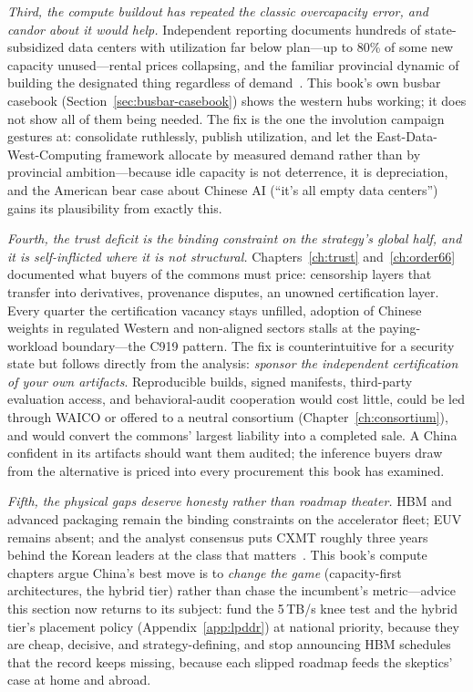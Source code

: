 \emph{Third, the compute buildout has repeated the classic overcapacity error, and candor about it would help.} Independent reporting documents hundreds of state-subsidized data centers with utilization far below plan---up to 80\% of some new capacity unused---rental prices collapsing, and the familiar provincial dynamic of building the designated thing regardless of demand~\cite{china-idle-dc}. This book's own busbar casebook (Section~\ref{sec:busbar-casebook}) shows the western hubs working; it does not show all of them being needed. The fix is the one the involution campaign gestures at: consolidate ruthlessly, publish utilization, and let the East-Data-West-Computing framework allocate by measured demand rather than by provincial ambition---because idle capacity is not deterrence, it is depreciation, and the American bear case about Chinese AI (``it's all empty data centers'') gains its plausibility from exactly this.

\emph{Fourth, the trust deficit is the binding constraint on the strategy's global half, and it is self-inflicted where it is not structural.} Chapters~\ref{ch:trust} and~\ref{ch:order66} documented what buyers of the commons must price: censorship layers that transfer into derivatives, provenance disputes, an unowned certification layer. Every quarter the certification vacancy stays unfilled, adoption of Chinese weights in regulated Western and non-aligned sectors stalls at the paying-workload boundary---the C919 pattern. The fix is counterintuitive for a security state but follows directly from the analysis: \emph{sponsor the independent certification of your own artifacts}. Reproducible builds, signed manifests, third-party evaluation access, and behavioral-audit cooperation would cost little, could be led through WAICO or offered to a neutral consortium (Chapter~\ref{ch:consortium}), and would convert the commons' largest liability into a completed sale. A China confident in its artifacts should want them audited; the inference buyers draw from the alternative is priced into every procurement this book has examined.

\emph{Fifth, the physical gaps deserve honesty rather than roadmap theater.} HBM and advanced packaging remain the binding constraints on the accelerator fleet; EUV remains absent; and the analyst consensus puts CXMT roughly three years behind the Korean leaders at the class that matters~\cite{china-hbm-gap}. This book's compute chapters argue China's best move is to \emph{change the game} (capacity-first architectures, the hybrid tier) rather than chase the incumbent's metric---advice this section now returns to its subject: fund the 5\,TB/s knee test and the hybrid tier's placement policy (Appendix~\ref{app:lpddr}) at national priority, because they are cheap, decisive, and strategy-defining, and stop announcing HBM schedules that the record keeps missing, because each slipped roadmap feeds the skeptics' case at home and abroad.

